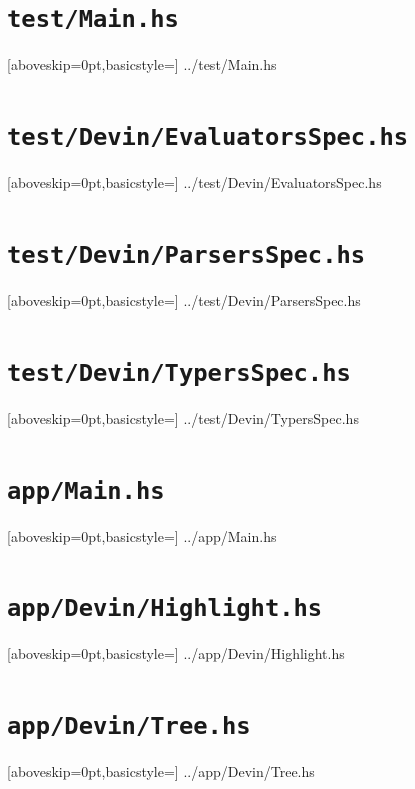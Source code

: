 \documentclass[UdineBachThesis,american,11pt,draft]{PhdThesis}
\begin{document}
  \section{\texttt{test/Main.hs}}

  
    [aboveskip=0pt,basicstyle=\ttfamily\footnotesize]
    {../test/Main.hs}

  \section{\texttt{test/Devin/EvaluatorsSpec.hs}}

  
    [aboveskip=0pt,basicstyle=\ttfamily\footnotesize]
    {../test/Devin/EvaluatorsSpec.hs}

  \section{\texttt{test/Devin/ParsersSpec.hs}}

  
    [aboveskip=0pt,basicstyle=\ttfamily\footnotesize]
    {../test/Devin/ParsersSpec.hs}

  \section{\texttt{test/Devin/TypersSpec.hs}}

  
    [aboveskip=0pt,basicstyle=\ttfamily\footnotesize]
    {../test/Devin/TypersSpec.hs}

  \section{\texttt{app/Main.hs}}
  \label{section:appmain}

  
    [aboveskip=0pt,basicstyle=\ttfamily\footnotesize]
    {../app/Main.hs}

  \section{\texttt{app/Devin/Highlight.hs}}

  
    [aboveskip=0pt,basicstyle=\ttfamily\footnotesize]
    {../app/Devin/Highlight.hs}

  \section{\texttt{app/Devin/Tree.hs}}

  
    [aboveskip=0pt,basicstyle=\ttfamily\footnotesize]
    {../app/Devin/Tree.hs}
\end{document}
